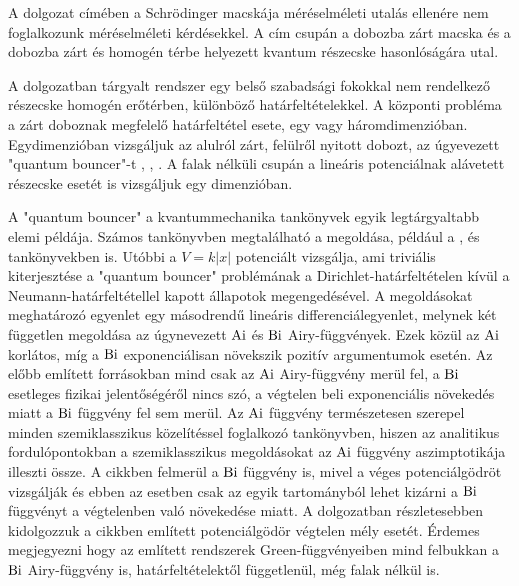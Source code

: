 A dolgozat címében a Schrödinger macskája méréselméleti utalás ellenére nem foglalkozunk méréselméleti kérdésekkel. A cím csupán a dobozba zárt macska és a dobozba zárt és homogén térbe helyezett kvantum részecske hasonlóságára utal.

A dolgozatban tárgyalt rendszer egy belső szabadsági fokokkal nem rendelkező részecske homogén erőtérben, különböző határfeltételekkel. A központi probléma a zárt doboznak megfelelő határfeltétel esete, egy vagy háromdimenzióban. Egydimenzióban vizsgáljuk az alulról zárt, felülről nyitott dobozt, az úgyevezett "quantum bouncer"-t \cite{vankov2009quantum}, \cite{doi:10.1119/1.10024}, \cite{doi:10.1119/1.16673}. A falak nélküli csupán a lineáris potenciálnak alávetett részecske esetét \cite[137-138.o.]{Vallee:2010:AFA} is vizsgáljuk egy dimenzióban.

A "quantum bouncer" a kvantummechanika tankönyvek egyik legtárgyaltabb elemi példája. Számos tankönyvben megtalálható a megoldása, például a \cite{Landau1981Quantum}, \cite{Griffiths2004Introduction} és \cite{Sakurai:1167961} tankönyvekben is. Utóbbi a $V=k\lvert x \rvert$ potenciált vizsgálja, ami triviális kiterjesztése a "quantum bouncer" problémának a Dirichlet-határfeltételen kívül a Neumann-határfeltétellel kapott állapotok megengedésével. A megoldásokat meghatározó egyenlet egy másodrendű lineáris differenciálegyenlet, melynek két független megoldása az úgynevezett $\mathrm{Ai}$ és $\mathrm{Bi}$ Airy-függvények. Ezek közül az $\mathrm{Ai}$ korlátos, míg a $\mathrm{Bi}$ exponenciálisan növekszik pozitív argumentumok esetén. Az előbb említett forrásokban mind csak az $\mathrm{Ai}$ Airy-függvény merül fel, a $\mathrm{Bi}$ esetleges fizikai jelentőségéről nincs szó, a végtelen beli exponenciális növekedés miatt a $\mathrm{Bi}$ függvény fel sem merül. Az $\mathrm{Ai}$ függvény természetesen szerepel minden szemiklasszikus közelítéssel foglalkozó tankönyvben, hiszen az analitikus fordulópontokban a szemiklasszikus megoldásokat az $\mathrm{Ai}$ függvény aszimptotikája illeszti össze. A \cite{doi:10.1007/s12043-001-0081-1} cikkben felmerül a $\mathrm{Bi}$ függvény is, mivel a véges potenciálgödröt vizsgálják és ebben az esetben csak az egyik tartományból lehet kizárni a $\mathrm{Bi}$ függvényt a végtelenben való növekedése miatt. A dolgozatban részletesebben kidolgozzuk a cikkben említett potenciálgödör végtelen mély esetét. Érdemes megjegyezni hogy az említett rendszerek Green-függvényeiben mind felbukkan a $\mathrm{Bi}$ Airy-függvény is, határfeltételektől függetlenül, még falak nélkül is.

